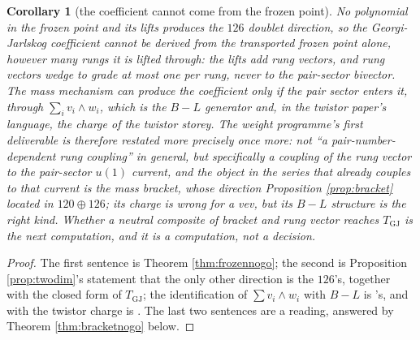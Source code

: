 \documentclass[11pt]{article}
\newtheorem{corollary}[theorem]{Corollary}
\theoremstyle{definition}
\begin{document}
\begin{corollary}[the coefficient cannot come from the frozen point]\label{cor:coeff}
No polynomial in the frozen point and its lifts produces the $126$ doublet direction, so the Georgi-Jarlskog coefficient cannot be derived from the transported frozen point alone, however many rungs it is lifted through: the lifts add rung vectors, and rung vectors wedge to grade at most one per rung, never to the pair-sector bivector. The mass mechanism can produce the coefficient only if the pair sector enters it, through $\sum_{i}v_{i}\wedge w_{i}$, which is the $B - L$ generator and, in the twistor paper's language, the charge of the twistor storey. The weight programme's first deliverable is therefore restated more precisely once more: not ``a pair-number-dependent rung coupling'' in general, but specifically a coupling of the rung vector to the pair-sector $u(1)$ current, and the object in the series that already couples to that current is the mass bracket, whose direction Proposition \ref{prop:bracket} located in $120 \oplus 126$; its charge is wrong for a vev, but its $B - L$ structure is the right kind. Whether a neutral composite of bracket and rung vector reaches $T_{\mathrm{GJ}}$ is the next computation, and it is a computation, not a decision.
\end{corollary}

\begin{proof}
The first sentence is Theorem \ref{thm:frozennogo}; the second is Proposition \ref{prop:twodim}'s statement that the only other direction is the $126$'s, together with the closed form of $T_{\mathrm{GJ}}$; the identification of $\sum v_{i}\wedge w_{i}$ with $B - L$ is \cite[Prop.~8.1]{ButlerT13}'s, and with the twistor charge is \cite[\S 3]{ButlerT9}. The last two sentences are a reading, answered by Theorem \ref{thm:bracketnogo} below.
\end{proof}
\end{document}
